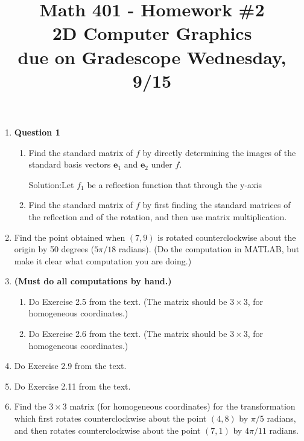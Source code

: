 \documentclass{article}
\begin{document}
\title{Math 401 - Homework \#2\\ 2D Computer Graphics\\ due on Gradescope Wednesday, 9/15}
\author{}
\date{}
\maketitle


\begin{enumerate}
	\item \textbf{Question 1} 
	\begin{enumerate}
		\item Find the standard matrix of $f$ by directly determining the images of the standard basis vectors $\mathbf{e}_1$ and $\mathbf{e}_2$ under $f$.
		\begin{enumerate}
			Solution:Let $f_1$ be a reflection function that through the y-axis
		
		\end{enumerate}

		\item Find the standard matrix of $f$ by first finding the standard matrices of the reflection and of the rotation, and then use matrix multiplication.
	\end{enumerate}
	



	\item Find the point obtained when $(7, 9)$ is rotated counterclockwise about the origin by 50 degrees ($5\pi/18$ radians).  (Do the computation in MATLAB, but make it clear what computation you are doing.)
	
	\item \textbf{(Must do all computations by hand.)} \begin{enumerate}
		\item Do Exercise 2.5 from the text.  (The matrix should be $3 \times 3$, for homogeneous coordinates.)
		\item Do Exercise 2.6 from the text.  (The matrix should be $3 \times 3$, for homogeneous coordinates.)
	\end{enumerate}
	
	\item Do Exercise 2.9 from the text.
	
	\item Do Exercise 2.11 from the text.
	
	\item Find the $3 \times 3$ matrix (for homogeneous coordinates) for the transformation which first rotates counterclockwise about the point $(4, 8)$ by $\pi/5$ radians, and then rotates counterclockwise about the point $(7,1)$ by $4\pi/11$ radians.
	

\end{enumerate}
\end{document}
